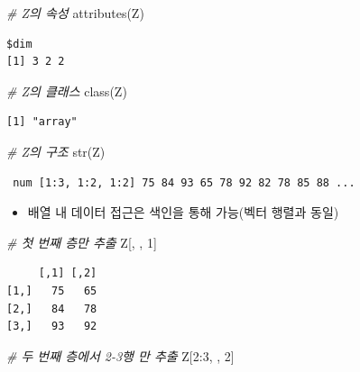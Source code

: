 \documentclass[
  11pt,
]{krantz}
\newenvironment{Shaded}{\begin{snugshade}}{\end{snugshade}}
\newcommand{\CommentTok}[1]{\textcolor[rgb]{0.37,0.37,0.37}{\textit{#1}}}
\newcommand{\DecValTok}[1]{\textcolor[rgb]{0.06,0.06,0.06}{#1}}
\newcommand{\FunctionTok}[1]{\textcolor[rgb]{0,0,0}{#1}}
\newcommand{\NormalTok}[1]{#1}
\newcommand{\SpecialCharTok}[1]{\textcolor[rgb]{0,0,0}{#1}}
\providecommand{\tightlist}{%
  \setlength{\itemsep}{0pt}\setlength{\parskip}{0pt}}
\begin{document}
\begin{Shaded}
\begin{Highlighting}[]
\CommentTok{\# Z의 속성}
\FunctionTok{attributes}\NormalTok{(Z)}
\end{Highlighting}
\end{Shaded}

\begin{verbatim}
$dim
[1] 3 2 2
\end{verbatim}

\begin{Shaded}
\begin{Highlighting}[]
\CommentTok{\# Z의 클래스}
\FunctionTok{class}\NormalTok{(Z)}
\end{Highlighting}
\end{Shaded}

\begin{verbatim}
[1] "array"
\end{verbatim}

\begin{Shaded}
\begin{Highlighting}[]
\CommentTok{\# Z의 구조}
\FunctionTok{str}\NormalTok{(Z)}
\end{Highlighting}
\end{Shaded}

\begin{verbatim}
 num [1:3, 1:2, 1:2] 75 84 93 65 78 92 82 78 85 88 ...
\end{verbatim}

\normalsize

\begin{itemize}
\tightlist
\item
  배열 내 데이터 접근은 색인을 통해 가능(벡터 행렬과 동일)
\end{itemize}

\footnotesize

\begin{Shaded}
\begin{Highlighting}[]
\CommentTok{\# 첫 번째 층만 추출}
\NormalTok{Z[, , }\DecValTok{1}\NormalTok{]}
\end{Highlighting}
\end{Shaded}

\begin{verbatim}
     [,1] [,2]
[1,]   75   65
[2,]   84   78
[3,]   93   92
\end{verbatim}

\begin{Shaded}
\begin{Highlighting}[]
\CommentTok{\# 두 번째 층에서 2{-}3행 만 추출}
\NormalTok{Z[}\DecValTok{2}\SpecialCharTok{:}\DecValTok{3}\NormalTok{, , }\DecValTok{2}\NormalTok{]}
\end{Highlighting}
\end{Shaded}
\end{document}
